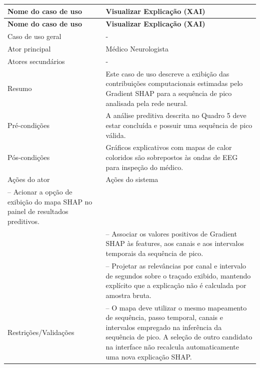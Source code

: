 \FloatBarrier{}
\nopagebreak[4]
\begingroup
\fontsize{10}{12}\selectfont
\setlength{\tabcolsep}{3pt}
\renewcommand{\arraystretch}{1.15}
\addtocounter{table}{-1}
\begin{longtable}{|>{\raggedright\arraybackslash}p{}|>{\raggedright\arraybackslash}p{}|}
\hline
\textbf{Nome do caso de uso} & \textbf{Visualizar Explicação (XAI)} \\ \hline
\endfirsthead
\hline
\textbf{Nome do caso de uso} & \textbf{Visualizar Explicação (XAI)} \\ \hline
\endhead
Caso de uso geral & - \\ \hline
Ator principal & Médico Neurologista \\ \hline
Atores secundários & - \\ \hline
Resumo & Este caso de uso descreve a exibição das contribuições computacionais estimadas pelo Gradient SHAP para a sequência de pico analisada pela rede neural. \\ \hline
Pré-condições & A análise preditiva descrita no Quadro 5 deve estar concluída e possuir uma sequência de pico válida. \\ \hline
Pós-condições & Gráficos explicativos com mapas de calor coloridos são sobrepostos às ondas de EEG para inspeção do médico. \\ \hline
Ações do ator & Ações do sistema \\ \hline
1 – Acionar a opção de exibição do mapa SHAP no painel de resultados preditivos. &  \\ \hline
 & 2 – Associar os valores positivos de Gradient SHAP às features, aos canais e aos intervalos temporais da sequência de pico. \\ \hline
 & 3 – Projetar as relevâncias por canal e intervalo de segundos sobre o traçado exibido, mantendo explícito que a explicação não é calculada por amostra bruta. \\ \hline
Restrições/Validações & 1 – O mapa deve utilizar o mesmo mapeamento de sequência, passo temporal, canais e intervalos empregado na inferência da sequência de pico. A seleção de outro candidato na interface não recalcula automaticamente uma nova explicação SHAP. \\ \hline
\end{longtable}
\endgroup
{}
\FloatBarrier{}

